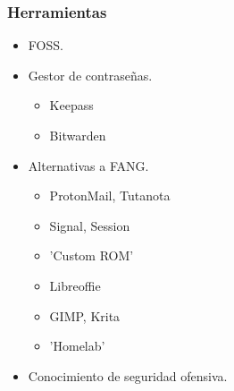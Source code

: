 \documentclass{beamer}
\begin{document}
\begin{frame}
 \frametitle{Herramientas}
 \begin{itemize}
  \item FOSS.
  \item Gestor de contraseñas.
    \begin{itemize}
     \item Keepass
     \item Bitwarden
    \end{itemize}

  \item Alternativas a FANG.
  \begin{itemize}
   \item ProtonMail, Tutanota
   \item Signal, Session
   \item 'Custom ROM'
   \item Libreoffie
   \item GIMP, Krita
   \item 'Homelab'
  \end{itemize}

  \item Conocimiento de seguridad ofensiva.
 \end{itemize}

\end{frame}
\end{document}
